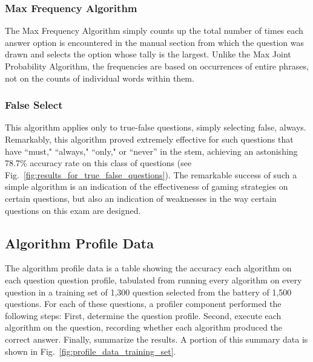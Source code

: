 \subsubsection{Max Frequency Algorithm}

The Max Frequency Algorithm simply counts up the total number of times each answer option is encountered in the manual section from which the question was drawn and selects the option whose tally is the largest.  Unlike the Max Joint Probability Algorithm, the frequencies are based on occurrences of entire phrases, not on the counts of individual words within them.

\subsubsection{False Select}

This algorithm applies only to true-false questions, simply selecting false, always.  Remarkably, this algorithm proved extremely effective for such questions that have ``must," ``always," ``only," or ``never'' in the stem, achieving an astonishing 78.7\% accuracy rate on this class of questions (see Fig.~\ref{fig:results_for_true_false_questions}).  The remarkable success of such a simple algorithm is an indication of the effectiveness of gaming strategies on certain questions, but also an indication of weaknesses in the way certain questions on this exam are designed.

\subsection{Algorithm Profile Data}

The algorithm profile data is a table showing the accuracy each algorithm on each question question profile, tabulated from running every algorithm on every question in a training set of 1,300 question selected from the battery of 1,500 questions.  For each of these questions, a profiler component performed the following steps:  First, determine the question profile.  Second, execute each algorithm on the question, recording whether each algorithm produced the correct answer.  Finally, summarize the results.  A portion of this summary data is shown in Fig.~\ref{fig:profile_data_training_set}.

